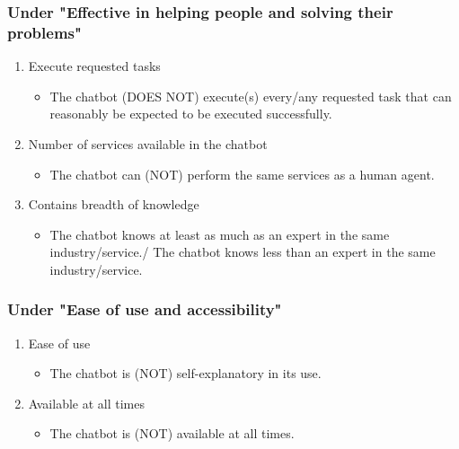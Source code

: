 \subsubsection{Under "Effective in helping people and solving their problems"}
\begin{enumerate}
	\item Execute requested tasks
	\begin{itemize}
		\item The chatbot (DOES NOT) execute(s) every/any requested task that can reasonably be expected to be executed successfully.
	\end{itemize}
	\item Number of services available in the chatbot
	\begin{itemize}
		\item The chatbot can (NOT) perform the same services as a human agent.
	\end{itemize}
	\item Contains breadth of knowledge
	\begin{itemize}
		\item The chatbot knows at least as much as an expert in the same industry/service./ The chatbot knows less than an expert in the same industry/service.
	\end{itemize}
\end{enumerate}

\subsubsection{Under "Ease of use and accessibility"}
\begin{enumerate}
	\item Ease of use
	\begin{itemize}
		\item The chatbot is (NOT) self-explanatory in its use.
	\end{itemize}
	\item Available at all times
	\begin{itemize}
		\item The chatbot is (NOT) available at all times.
	\end{itemize}
\end{enumerate}

